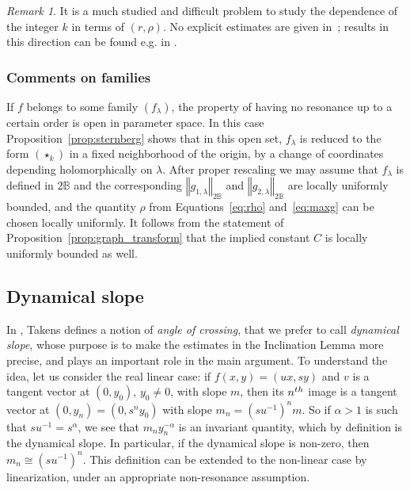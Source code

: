 \documentclass[11pt, oneside]{amsart}
\newcommand{\B}{\mathbb{B}}
\newcommand{\norm}[1]{\left\Vert#1\right\Vert}
\newcommand{\inv}{^{-1}}
\theoremstyle{remark}
\newtheorem{rmk}[prop]{Remark}
\theoremstyle{definition}
\theoremstyle{theorem}
\newcommand{\commentaire}[1]{}
\begin{document}
\begin{rmk}\label{rmk:uniformity_k}
It is a much studied and difficult problem to study the dependence of the integer 
$k$ in terms of $(r, \rho)$.  No explicit estimates are  given in~\cite{sternberg2}; 
results in this direction can be found e.g.  in \cite{belitsky, sell}. 
\end{rmk}

\subsubsection{Comments on families}\label{subs:remark_families}
If  $f$ belongs to some family $(f_\lambda)$, the property of 
having no resonance up to a certain order is   open   in  
 parameter space. In this case    
 Proposition~\ref{prop:sternberg} shows that in this open set, 
 $f_\lambda$ is reduced to the form $(\star_k)$ 
 in a fixed neighborhood of the origin,
 by  a change of coordinates 
 depending   holomorphically on $\lambda$. 
 After proper rescaling we may assume  that $f_\lambda$ is defined in $2\B$
 and the corresponding 
 $\norm{g_{1, \lambda}}_{2\B}$ and $\norm{g_{2, \lambda}}_{2\B}$  are locally uniformly bounded, 
 and the quantity $\rho$ from Equations~\eqref{eq:rho} and~\eqref{eq:maxg} 
 can be chosen locally uniformly. 
It follows from the statement of  Proposition~\ref{prop:graph_transform} that 
the implied constant 
$C$  is locally uniformly bounded as well. \commentaire{No verification is now left to the reader in this paragraph (cf. Exposition Rmk \#3)}
 
\subsection{Dynamical slope}\label{subs:slope}
In \cite[\S 3.4]{takens}, Takens  defines a notion of \emph{angle of crossing}, that we prefer to call \emph{dynamical slope}, whose purpose is to make the estimates in the Inclination Lemma more precise, and plays an important role in the main argument. To understand the idea, let us   consider the real 
 linear case: 
if $f(x,y)  = (ux, sy)$ and $v$ is a tangent vector at $(0, y_0)$, $y_0\neq 0$, 
 with slope $m$, then its $n^{\rm th}$
  image is a tangent vector at $(0, y_n) = (0, s^ny_0) $ with slope $m_n=(su\inv)^nm$.  
So if $\alpha>1$ is such that $su\inv = s^\alpha$, we see that $ {m_n}{y_n^{-\alpha}}$ 
is an invariant quantity, which by definition is the dynamical slope. In particular, if the dynamical slope is non-zero, then $m_n\cong (su\inv)^n$.
This definition can be extended to the non-linear case by linearization,
 under an appropriate non-resonance 
assumption. 
\end{document}
